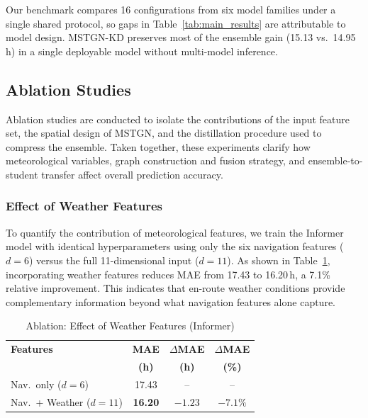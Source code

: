 \documentclass[sigconf,anonymous]{acmart}%
\begin{document}
Our benchmark compares 16 configurations from six model families under a single shared protocol, so gaps in Table~\ref{tab:main_results} are attributable to model design. MSTGN-KD preserves most of the ensemble gain (15.13 vs.\ 14.95\,h) in a single deployable model without multi-model inference.




\subsection{Ablation Studies}
\label{sec:ablations}

Ablation studies are conducted to isolate the contributions of the input feature set, the spatial design of MSTGN, and the distillation procedure used to compress the ensemble. Taken together, these experiments clarify how meteorological variables, graph construction and fusion strategy, and ensemble-to-student transfer affect overall prediction accuracy.

\subsubsection{Effect of Weather Features}

To quantify the contribution of meteorological features, we train the Informer model with identical hyperparameters using only the six navigation features ($d = 6$) versus the full 11-dimensional input ($d = 11$). As shown in Table~\ref{tab:ablation_weather}, incorporating weather features reduces MAE from 17.43 to 16.20\,h, a 7.1\% relative improvement. This indicates that en-route weather conditions provide complementary information beyond what navigation features alone capture.

\begin{table}[t]
    \centering
    \caption{Ablation: Effect of Weather Features (Informer)}
    \label{tab:ablation_weather}
    \footnotesize
    \begin{tabular}{lccc}
        \toprule
        \textbf{Features} & \textbf{MAE} & $\Delta$\textbf{MAE} & $\Delta$\textbf{MAE} \\
        & \textbf{(h)} & \textbf{(h)} & \textbf{(\%)} \\
        \midrule
        Nav.\ only ($d=6$) & 17.43 & -- & -- \\
        Nav.\ + Weather ($d=11$) & \textbf{16.20} & $-1.23$ & $-7.1\%$ \\
        \bottomrule
    \end{tabular}
\end{table}
\end{document}
